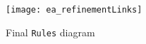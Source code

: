 \begin{itemize}
\newpage

\vspace*{2cm}

\begin{figure}[htbp]
\begin{center}
  \texttt{[image: ea\_refinementLinks]}
  \caption{Final \texttt{Rules} diagram}
  \label{ea:refinementClasses}
\end{center}
\end{figure}









\end{itemize}
